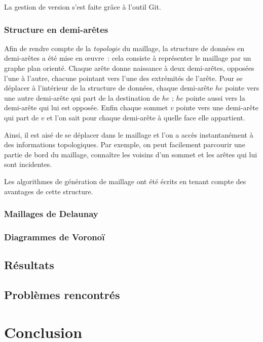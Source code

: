 \documentclass[12pt,a4paper,draft]{report}
\begin{document}
La gestion de version s'est faite grâce à l'outil Git.

\subsubsection{Structure en demi-arêtes}

Afin de rendre compte de la \emph{topologie} du maillage, la structure de données en demi-arêtes a été mise en \oe{}uvre~: cela consiste à représenter le maillage par un graphe plan orienté. Chaque arête donne naissance à deux demi-arêtes, opposées l'une à l'autre, chacune pointant vers l'une des extrémités de l'arête. Pour se déplacer à l'intérieur de la structure de données, chaque demi-arête $he$ pointe vers une autre demi-arête qui part de la destination de $he$ ; $he$ pointe aussi vers la demi-arête qui lui est opposée. Enfin chaque sommet $v$ pointe vers une demi-arête qui part de $v$ et l'on sait pour chaque demi-arête à quelle face elle appartient.

Ainsi, il est aisé de se déplacer dans le maillage et l'on a accès instantanément à des informations topologiques. Par exemple, on peut facilement parcourir une partie de bord du maillage, connaître les voisins d'un sommet et les arêtes qui lui sont incidentes.

Les algorithmes de génération de maillage ont été écrits en tenant compte des avantages de cette structure.

\subsubsection{Maillages de Delaunay}
\subsubsection{Diagrammes de Voronoï}

\subsection{Résultats}


\subsection{Problèmes rencontrés}


\section{Conclusion}
\end{document}
